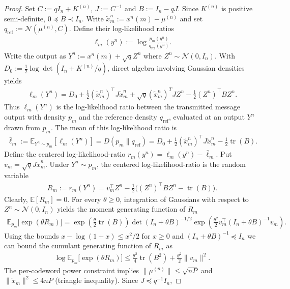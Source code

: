 \documentclass[11pt,onecolumn]{IEEEtran}
\newcommand{\calN}{\mathcal{N}}
\newcommand{\bbE}{\mathbb{E}}
\newcommand{\tilx}{\tilde{x}}
\DeclareMathOperator{\tr}{tr}
\begin{document}
\begin{proof}
Set $C := qI_n+K^{(n)}$, $J := C^{-1}$ and $B :=I_n-qJ$. Since $K^{(n)}$ is positive semi-definite, $0\preceq B \prec I_n$. Write $\tilx_m^n:=x^n(m)-\mu^{(n)}$ and set $q_{\mathrm{ref}} := \calN(\mu^{(n)}, C)$. Define their log-likelihood ratios 
\begin{align}
    \ell_m(y^n) := \log\frac{p_m(y^n)}{q_{\mathrm{ref}}(y^n)} .
\end{align}
Write the output as $Y^n :=x^n(m)+\sqrt{q}Z^n$ where $Z^n \sim\calN(0,I_n)$. With $D_0:=\frac{1}{2}\log\det(I_n+K^{(n)}/q)$, direct algebra involving Gaussian densities yields
\begin{align}
    \ell_m(Y^n)=D_0+\frac{1}{2}(\tilx_m^n)^\top J \tilx_m^n+\sqrt{q}(\tilx_m^n)^T J Z^n- \frac{1}{2} (Z^n)^\top B Z^n.
\end{align}
Thus $\ell_m(Y^n)$ is the log-likelihood ratio between the transmitted message output with density $p_m$ and the reference density $q_{\mathrm{ref}}$, evaluated at an output $Y^n$ drawn from $p_m$. The mean of this log-likelihood ratio is 
\begin{align}
   \bar{\ell}_m:= \bbE_{Y^n\sim p_m} [\ell_m(Y^n)]=D(p_m\|q_{\mathrm{ref}})= D_0+\frac{1}{2}(\tilx_m^n)^\top J \tilx_m^n-\frac{1}{2}\tr(B).
\end{align}
Define the centered  log-likelihood-ratio $r_m(y^n)=\ell_m(y^n)-\bar{\ell}_m$. Put $v_m=\sqrt{q}J \tilx_m^n$. Under $Y^n\sim p_m$, the centered  log-likelihood-ratio  is the random variable
\begin{align}
    R_m:=r_m(Y^n)=v_m^\top Z^n- \frac{1}{2}\big( (Z^n)^\top B Z^n -\tr(B)\big).
\end{align}
Clearly, $\bbE [R_m]=0$. For every $\theta\ge0$, integration of Gaussians with respect to $Z^n\sim\calN(0,I_n)$ yields the moment generating function of $R_m$
\begin{align}
    \bbE_{p_m}\big[ \!\exp(\theta R_m) \big] = \exp\left(\frac{\theta}{2}\tr(B) \right)\det(I_n+\theta B)^{-1/2}\exp\left(\frac{\theta^2}{2}v_m^\top (I_n+\theta B)^{-1}v_m\right).
\end{align}
Using the bounds $x-\log(1+x)\le x^2/2$ for $x\ge0$ and $(I_n+\theta B)^{-1}\preceq I_n$ we can bound the cumulant generating function of $R_m$ as 
\begin{align}
    \log \bbE_{p_m}\big[\! \exp(\theta R_m) \big] \le\frac{\theta^2}{4}\tr(B^2)+\frac{\theta^2}{2}\|v_m\|^2. \label{eqn:cgf}
\end{align}
The per-codeword power constraint implies $\|\mu^{(n)}\|\le\sqrt{nP} $ and $\|\tilx_m\|^2\le 4 nP$ (triangle inequality). Since $J\preceq q^{-1}I_n$,

\end{proof}
\end{document}
